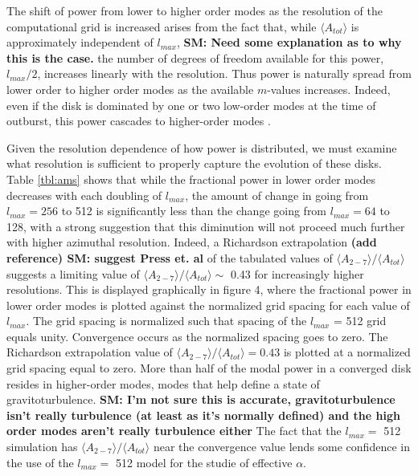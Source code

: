 \documentclass[manuscript]{aastex} %
\begin{document}
The shift of power from lower to higher order modes as the resolution of the computational grid is increased arises from the fact that, while $\langle A_{tot} \rangle$ is approximately independent of $l_{max}$, {\bf SM: Need some explanation as to why this is the case.} the number of degrees of freedom available for this power, $l_{max}/2$, increases linearly with the resolution. Thus power is naturally spread from lower order to higher order modes as the available $m$-values increases. Indeed, even if the disk is dominated by one or two low-order modes at the time of outburst, this power cascades to higher-order modes \citep[for example][]{laughlin1997, laughlin1998,laughlin1996}.


Given the resolution dependence of how power is distributed,  we must examine what resolution is sufficient to properly capture the evolution of these disks. Table \ref{tbl:ams} shows that while the fractional power in lower order modes decreases with each doubling of $l_{max}$, the amount of change in going from $l_{max} = 256$ to 512 
is significantly less than the change going from $l_{max} = 64$ to 128, with a strong suggestion that this diminution will not proceed much further with higher azimuthal resolution. Indeed, a  Richardson extrapolation {\bf (add reference) SM: suggest Press et. al} \citep{press1992} of the tabulated values of  $\langle A_{2-7} \rangle / \langle A_{tot} \rangle$ suggests a limiting value of  $\langle A_{2-7} \rangle / \langle A_{tot} \rangle \sim$ 0.43 for increasingly higher resolutions. This is displayed graphically in figure 4, where the fractional power in lower order modes is plotted against the  normalized grid 
spacing for each value of $l_{max}$. The grid spacing  is normalized such that spacing of the $l_{max}$ = 512 grid
equals unity.  Convergence occurs as the normalized spacing goes to zero. The Richardson extrapolation value  of $\langle A_{2-7}\rangle  / \langle A_{tot}\rangle  = 0.43$ is plotted at a normalized grid spacing  equal to zero. More than half of the modal power in a converged disk resides in higher-order modes, modes that help define a state of gravitoturbulence. {\bf SM: I'm not sure this is accurate, gravitoturbulence isn't really turbulence (at least as it's normally defined) and the high order modes aren't really turbulence either} The fact that the $l_{max} =$ 512 simulation has $\langle A_{2-7} \rangle / \langle A_{tot} \rangle$ near the convergence value lends some confidence in the use of the $l_{max} =$ 512 model for the studie of effective $\alpha$. 
\end{document}

